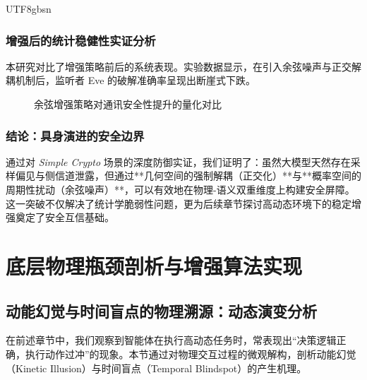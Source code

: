 \documentclass[11pt,a4paper]{article}
\begin{document}
\begin{CJK*}{UTF8}{gbsn}
\subsubsection{增强后的统计稳健性实证分析}
本研究对比了增强策略前后的系统表现。实验数据显示，在引入余弦噪声与正交解耦机制后，监听者 Eve 的破解准确率呈现出断崖式下跌。

\begin{figure}[h!]
\centering
{}
\caption{余弦增强策略对通讯安全性提升的量化对比}
\end{figure}



\subsubsection{结论：具身演进的安全边界}
通过对 \textit{Simple Crypto} 场景的深度防御实证，我们证明了：虽然大模型天然存在采样偏见与侧信道泄露，但通过**几何空间的强制解耦（正交化）**与**概率空间的周期性扰动（余弦噪声）**，可以有效地在物理-语义双重维度上构建安全屏障。这一突破不仅解决了统计学脆弱性问题，更为后续章节探讨高动态环境下的稳定增强奠定了安全互信基础。

\newpage

\section{底层物理瓶颈剖析与增强算法实现}

\subsection{动能幻觉与时间盲点的物理溯源：动态演变分析}
在前述章节中，我们观察到智能体在执行高动态任务时，常表现出“决策逻辑正确，执行动作过冲”的现象。本节通过对物理交互过程的微观解构，剖析动能幻觉（Kinetic Illusion）与时间盲点（Temporal Blindspot）的产生机理。


\end{CJK*}
\end{document}
